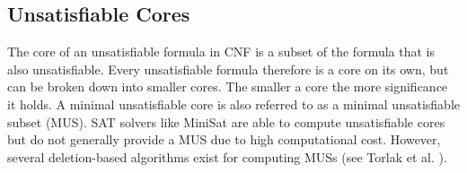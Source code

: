 
\subsection{Unsatisfiable Cores}
The core of an unsatisfiable formula in CNF is a subset of the formula that is also unsatisfiable. Every unsatisfiable formula therefore is a core on its own, but can be broken down into smaller cores. The smaller a core the more significance it holds. A minimal unsatisfiable core is also referred to as a minimal unsatisfiable subset (MUS). SAT solvers like MiniSat \cite{een2003extensible} are able to compute unsatisfiable cores but do not generally provide a MUS due to high computational cost. However, several deletion-based algorithms exist for computing MUSs (see Torlak et al. \cite{10.1007/978-3-540-68237-0_23}).